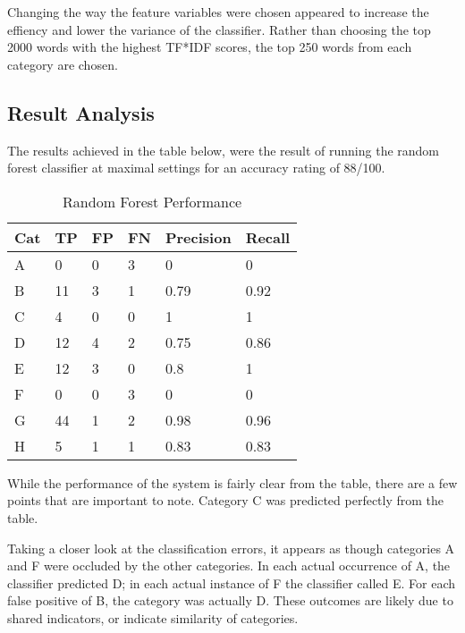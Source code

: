 \documentclass[11pt]{article}
\begin{document}
Changing the way the feature variables were chosen appeared to increase the
effiency and lower the variance of the classifier. Rather than choosing the top
2000 words with the highest TF*IDF scores, the top 250 words from each category
are chosen.

\subsection{Result Analysis}

The results achieved in the table below, were the result of running the random
forest classifier at maximal settings for an accuracy rating of 88/100.

\begin{table}[h]
\begin{center}
    \begin{tabular}{|l|l|l|l|l|l|}
        \hline
        Cat & TP & FP & FN & Precision & Recall \\
        \hline \hline
        A & 0   & 0 & 3 & 0    & 0      \\
        B & 11  & 3 & 1 & 0.79 & 0.92   \\
        C & 4   & 0 & 0 & 1    & 1      \\
        D & 12  & 4 & 2 & 0.75 & 0.86   \\
        E & 12  & 3 & 0 & 0.8  & 1      \\
        F & 0   & 0 & 3 & 0    & 0      \\
        G & 44  & 1 & 2 & 0.98 & 0.96   \\
        H & 5   & 1 & 1 & 0.83 & 0.83   \\
        \hline
    \end{tabular}
\caption{Random Forest Performance}\label{table1}
\end{center}
\end{table}

While the performance of the system is fairly clear from the table, there are a
few points that are important to note. Category C was predicted perfectly from
the table.

Taking a closer look at the classification errors, it appears as though
categories A and F were occluded by the other categories. In each actual
occurrence of A, the classifier predicted D; in each actual instance of F the
classifier called E. For each false positive of B, the category was actually D.
These outcomes are likely due to shared indicators, or indicate similarity of
categories.
\end{document}
